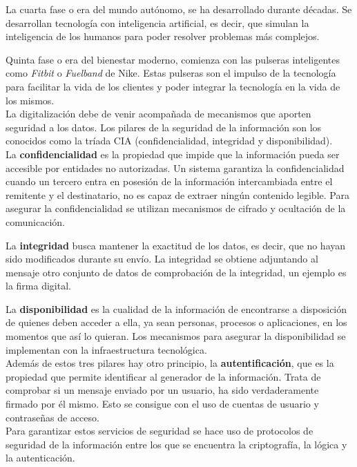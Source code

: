 La cuarta fase o era del mundo autónomo, se ha desarrollado durante décadas. Se desarrollan tecnología con inteligencia artificial, es decir, que simulan la inteligencia de los humanos para poder resolver problemas más complejos.

Quinta fase o era del bienestar moderno, comienza con las pulseras inteligentes como \textit{Fitbit} o \textit{Fuelband} de Nike. Estas pulseras son el impulso de la tecnología para facilitar la vida de los clientes y poder integrar la tecnología en la vida de los mismos.\\

La digitalización debe de venir acompañada de mecanismos que aporten seguridad a los datos. Los pilares de la seguridad de la información son los conocidos como la tríada CIA (confidencialidad, integridad y  disponibilidad)\cite{servicios-seguridad}.\\

La \textbf{confidencialidad} es la propiedad que impide que la información pueda ser accesible por entidades no autorizadas. Un sistema garantiza la confidencialidad cuando un tercero entra en posesión de la información intercambiada entre el remitente y el destinatario, no es capaz de extraer ningún contenido legible. Para asegurar la confidencialidad se utilizan mecanismos de cifrado y ocultación de la comunicación.

La \textbf{integridad} busca mantener la exactitud de los datos, es decir, que no hayan sido modificados durante su envío. La integridad se obtiene adjuntando al mensaje otro conjunto de datos de comprobación de la integridad, un ejemplo es la firma digital.

La \textbf{disponibilidad} es la cualidad de la información de encontrarse a disposición de quienes deben acceder a ella, ya sean personas, procesos o aplicaciones, en los momentos que así lo quieran. Los mecanismos para asegurar la disponibilidad se implementan con la infraestructura tecnológica.\\

Además de estos tres pilares hay otro principio, la \textbf{autentificación}, que es la propiedad que permite identificar al generador de la información. Trata de comprobar si un mensaje enviado por un usuario, ha sido verdaderamente firmado por él mismo. Esto se consigue con el uso de cuentas de usuario y contraseñas de acceso.\\

Para garantizar estos servicios de seguridad se hace uso de protocolos de seguridad de la información entre los que se encuentra la criptografía, la lógica y la autenticación.\\

